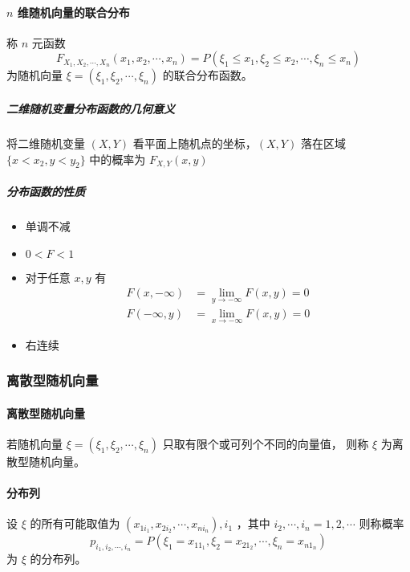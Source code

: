 \paragraph{$ n $ 维随机向量的联合分布} 称 $ n $ 元函数
$$ F_{X_1 , X_2 , \cdots , X_n }(x_{1} , x_{2} , \cdots , x_{n}) = P(\xi_{1} \leqslant x_1 , \xi_{2} \leqslant x_2 , \cdots , \xi_{n} \leqslant x_n ) $$
为随机向量 $ \xi = (\xi_1, \xi_2, \cdots, \xi_n) $ 的联合分布函数。

\subparagraph{二维随机变量分布函数的几何意义}
将二维随机变量 $ (X,Y) $ 看平面上随机点的坐标，$ (X,Y) $ 落在区域 $ \{ x < x_2, y < y_2 \} $ 中的概率为 $ F_{X,Y}(x,y) $

\subparagraph{分布函数的性质} 
\begin{itemize}[leftmargin=\subparitemindent]
    \item 单调不减
    \item $ 0 < F < 1 $
    \item 对于任意 $ x,y $ 有 \begin{align}
        F(x, -\infty) & = \lim_{y \rightarrow -\infty} F(x,y) = 0 \\
        F(-\infty, y) & = \lim_{x \rightarrow -\infty} F(x,y) = 0
    \end{align}
    \item 右连续
\end{itemize}

\subsubsection{离散型随机向量}

\paragraph{离散型随机向量} 若随机向量 $ \xi = (\xi_{1} , \xi_{2} , \cdots , \xi_{n}) $ 只取有限个或可列个不同的向量值，
则称 $ \xi $ 为离散型随机向量。

\paragraph{分布列} 设 $ \xi $ 的所有可能取值为 $ (x_{1i_1} , x_{2i_2} , \cdots , x_{ni_n} ), i_{1} $ ，其中 $ i_{2} , \cdots , i_{n} = 1,2,\cdots $
则称概率
\begin{equation}
    p_{i_{1} , i_{2} , \cdots , i_{n} } = P(\xi_{1} = x_{11_{1}} , \xi_{2} = x_{21_{2}} , \cdots , \xi_{n} = x_{n1_{n}} ) 
\end{equation}
为 $ \xi $ 的分布列。

